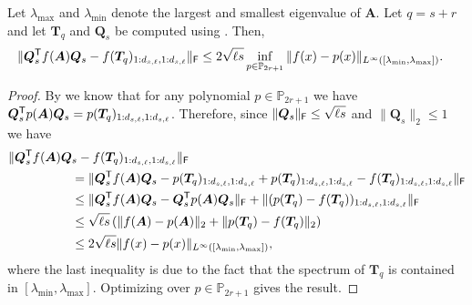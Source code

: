 \begin{lemma}\label{lemma:2_times_polynomial_approx}
Let $\lambda_{\max}$ and $\lambda_{\min}$ denote the largest and smallest eigenvalue of $\bm{A}$. Let $q = s+r$ and let $\bm{T}_q$ and $\bm{Q}_s$ be computed using . Then, 
\begin{align*}
    &\|\bm{Q}_s^{\textsf{\textup{T}}} f(\bm{A})\bm{Q}_s - f(\bm{T}_q)_{1:d_{s,\ell},1:d_{s,\ell}}\|_{\textsf{\textup{F}}} \leq 2\sqrt{\ell s} \inf\limits_{p \in \mathbb{P}_{2r+1}}\|f(x)-p(x)\|_{L^{\infty}([\lambda_{\min},\lambda_{\max}])}.
\end{align*}
\end{lemma}
\begin{proof}
By  we know that for any polynomial $p \in \mathbb{P}_{2r+1}$ we have $\bm{Q}_s^{\textsf{\textup{T}}} p(\bm{A}) \bm{Q}_{s} = p(\bm{T}_q)_{1:d_{s,\ell},1:d_{s,\ell}}$.
Therefore, since $\|\bm{Q}_s\|_{\textsf{\textup{F}}} \leq \sqrt{\ell s}$ and $\|\bm{Q}_s\|_2 \leq 1$ we have
\begin{align*}
    \hspace{5em}&\hspace{-5em}\|\bm{Q}_s^\T f(\bm{A})\bm{Q}_s - f(\bm{T}_q)_{1:d_{s,\ell},1:d_{s,\ell}}\|_\F
    \\&= \|\bm{Q}_s^\T f(\bm{A}) \bm{Q}_s - p(\bm{T}_q)_{1:d_{s,\ell},1:d_{s,\ell}} + p(\bm{T}_q)_{1:d_{s,\ell},1:d_{s,\ell}} - f(\bm{T}_q)_{1:d_{s,\ell},1:d_{s,\ell}} \|_\F 
    \\&\leq \|\bm{Q}_s^\T f(\bm{A}) \bm{Q}_s - \bm{Q}_s^\T p(\bm{A}) \bm{Q}_s \|_\F +  \|(p(\bm{T}_q) - f(\bm{T}_q) )_{1:d_{s,\ell},1:d_{s,\ell}} \|_\F 
    \\&\leq \sqrt{\ell s} \left( \|f(\bm{A}) - p(\bm{A}) \|_2 +  \| p(\bm{T}_q)  - f(\bm{T}_q) \|_2\right)
    \\&\leq 2 \sqrt{\ell s} \|f(x) - p(x)\|_{L^{\infty}([\lambda_{\min},\lambda_{\max}])},
\end{align*}
where the last inequality is due to the fact that the spectrum of $\bm{T}_q$ is contained in $[\lambda_{\min},\lambda_{\max}]$.
Optimizing over $p\in\mathbb{P}_{2r+1}$ gives the result.

\end{proof}
